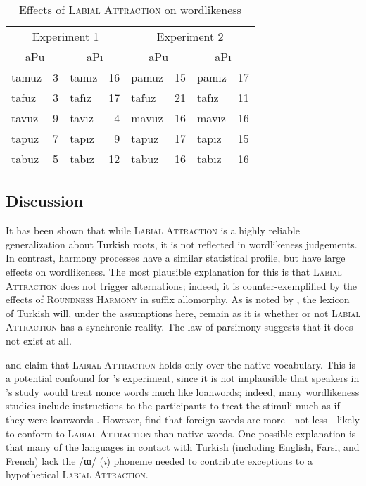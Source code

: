 \begin{table}[t]
\centering
\begin{tabular}{lrlr|lrlr}
\toprule
\multicolumn{4}{c|}{Experiment 1} & \multicolumn{4}{c}{Experiment 2} \\
\multicolumn{2}{c}{aPu} & \multicolumn{2}{c|}{aPı} & \multicolumn{2}{c}{aPu} & \multicolumn{2}{c}{aPı} \\
\midrule
{tamuz} & 3 & {tamız} & 16 & {pamuz} & 15 & {pamız} & 17 \\
{tafuz} & 3 & {tafız} & 17 & {tafuz} & 21 & {tafız} & 11 \\
{tavuz} & 9 & {tavız} & 4  & {mavuz} & 16 & {mavız} & 16 \\
{tapuz} & 7 & {tapız} & 9  & {tapuz} & 17 & {tapız} & 15 \\
{tabuz} & 5 & {tabız} & 12 & {tabuz} & 16 & {tabız} & 16 \\
\bottomrule
\end{tabular}
\caption{Effects of \textsc{Labial Attraction} on wordlikeness \citep[from][]{Zimmer1969}}
\label{law}
\end{table}

\subsection{Discussion}

It has been shown that while \textsc{Labial Attraction} is a highly reliable generalization about Turkish roots, it is not reflected in wordlikeness judgements.
In contrast, harmony processes have a similar statistical profile, but have large effects on wordlikeness.
The most plausible explanation for this is that  \textsc{Labial Attraction} does not trigger alternations; indeed, it is counter-exemplified by the effects of \textsc{Roundness Harmony} in suffix allomorphy.
As is noted by \citet[412f.]{Inkelas1997}, the lexicon of Turkish will, under the assumptions here, remain as it is whether or not \textsc{Labial Attraction} has a synchronic reality.
The law of parsimony suggests that it does not exist at all.

\citet{Ito1995a,Ito1995b} and \citet{NiChiosain1993} claim that \textsc{Labial Attraction} holds only over the native vocabulary.
This is a potential confound for \citeauthor{Zimmer1969}'s experiment, since it is not implausible that speakers in \citeauthor{Zimmer1969}'s study would treat nonce words much like loanwords; indeed, many wordlikeness studies include instructions to the participants to treat the stimuli much as if they were loanwords \citep[e.g.,][]{Hay2004a}.
However, \citet{Inkelas2001} find that foreign words are more---not less---likely to conform to \textsc{Labial Attraction} than native words.
One possible explanation is that many of the languages in contact with Turkish (including English,  Farsi, and French) lack the /ɯ/ (\emph{ı}) phoneme needed to contribute exceptions to a hypothetical \textsc{Labial Attraction}.


